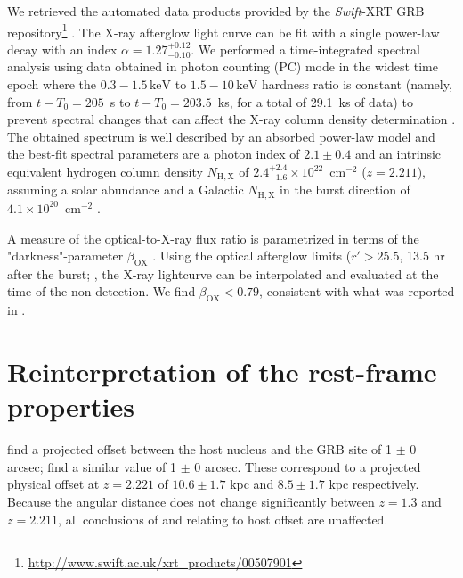 \documentclass[referee]{aa}
\begin{document}
We retrieved the automated data products provided by the \textit{Swift}-XRT GRB
repository\footnote{\url{http://www.swift.ac.uk/xrt\_products/00507901}}
\citep{Evans2009}. 
The X-ray afterglow light curve can be fit with a single power-law decay with an
index $\alpha=1.27_{-0.10}^{+0.12}$. We performed a time-integrated spectral
analysis using data obtained in photon counting (PC) mode in the widest time epoch where
the $0.3-1.5\,\mathrm{keV}$ to $1.5-10\,\mathrm{keV}$ hardness ratio is constant
(namely, from $t-T_0 = 205$~s to $t-T_0 = 203.5$~ks, for a total of 29.1~ks of
data) to prevent spectral changes that can affect the X-ray column density
determination \citep{Kopac2012}. 
The obtained spectrum is well described by an absorbed power-law
model and the best-fit spectral parameters are a photon index of $2.1 \pm 0.4$ and
an intrinsic equivalent hydrogen column density $N_{\mathrm{H,X}}$ of $2.4_{-1.6}^{+2.4}
\times 10^{22}$~cm$^{-2}$ ($z=2.211$), assuming a solar abundance and a Galactic $N_{\mathrm{H,X}}$ in
the burst direction of $4.1 \times 10^{20}$~cm$^{-2}$ \citep{Willingale2013}.

A measure of the optical-to-X-ray flux ratio is parametrized in terms of the
"darkness"-parameter $\beta_\mathrm{OX} $ \citep{Jakobsson2004}. Using the optical
afterglow limits ($r' > 25.5$, 13.5 hr after the burst; \citealt{Cucchiara2011,
	Cenko2011}, the X-ray lightcurve can be interpolated and evaluated at the time
of the non-detection. We find $\beta_\mathrm{OX} < 0.79$, consistent with what was
reported in \citet{Sakamoto2013}.

\section{Reinterpretation of the rest-frame properties}

\citet{Margutti2012} find a projected offset between the host nucleus and the
GRB site of 1 $\pm$ 0 arcsec; \citet{Sakamoto2013}
find a similar value of 1 $\pm$ 0 arcsec. These correspond
to a projected physical offset at $z = 2.221$ of $10.6 \pm 1.7$ kpc and $8.5 \pm
1.7$ kpc respectively. Because the angular distance does not change
significantly between $z = 1.3$ and $z = 2.211$, all conclusions of
\citet{Margutti2012} and \citet{Sakamoto2013} relating to host offset are
unaffected.

\end{document}
